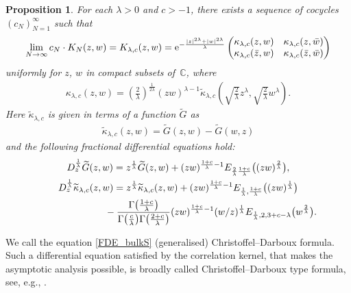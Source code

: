 \documentclass[pdftex]{sigma}
\numberwithin{equation}{section}
\newtheorem{Proposition}[Theorem]{Proposition}
 { \theoremstyle{definition}
\newtheorem{Definition}[Theorem]{Definition}
\newtheorem{Example}[Theorem]{Example}
\newtheorem{Remark}[Theorem]{Remark} }
\newcommand{\C}{{\mathbb C}}
\newcommand{\1}{\chi}
\begin{document}
\begin{Proposition} \label{Thm_bulkS}
	For each $\lambda>0$ and $c>-1$, there exists a sequence of cocycles $(c_N)_{N=1}^\infty$ such that
	\begin{gather*}
			\lim_{N \to \infty} c_N\cdot K_N(z,w)=K_{\lambda,c}(z,w)
			={\rm e}^{ -\frac{ |z|^{2\lambda}+|w|^{2\lambda} }{\lambda} } \begin{pmatrix}
				\kappa_{\lambda,c}(z,w) & \kappa_{\lambda,c}(z,\bar{w}) \\
				\kappa_{\lambda,c}(\bar{z},w) & \kappa_{\lambda,c}(\bar{z},\bar{w})
			\end{pmatrix}
		\end{gather*}
	uniformly for $z$, $w$ in compact subsets of~$\C$, where
	\begin{gather*}
		\kappa_{\lambda,c}(z,w)=\left( \frac{2}{\lambda} \right)^{ \frac{1}{2\lambda} } (zw)^{\lambda-1} \widetilde{\kappa}_{\lambda,c} \left( \sqrt{ \frac{2}{\lambda} } z^\lambda, \sqrt{ \frac{2}{\lambda} } w^\lambda \right).
	\end{gather*}
	Here $\widetilde{\kappa}_{\lambda,c}$ is given in terms of a function $\widetilde{G}$ as
	\begin{gather*}
	\widetilde{\kappa}_{\lambda,c}(z,w)=\widetilde{G}(z,w)-\widetilde{G}(w,z)
	\end{gather*}
 and the following fractional differential equations hold:
	\begin{gather} \label{G zw FDE}
		D_z^{ \frac{1}{\lambda} } \widetilde{G}(z,w)= z^{ \frac{1}{\lambda} } \widetilde{G}(z,w)+(zw)^{\frac{1+c}{\lambda}-1} E_{\frac{2}{\lambda} \frac{1+c}{\lambda} } \big( (zw)^{\frac{2}{\lambda}} \big),
\\
			D_z^{ \frac{1}{\lambda} } \widetilde{\kappa}_{\lambda,c}(z,w)
			= z^{ \frac{1}{\lambda} } \widetilde{\kappa}_{\lambda,c}(z,w)+ (zw)^{ \frac{1+c}{\lambda}-1 } E_{ \frac{1}{\lambda},\frac{1+c}{\lambda} } \big( (zw)^{\frac{1}{\lambda}} \big)
			\nonumber\\
\hphantom{D_z^{ \frac{1}{\lambda} } \widetilde{\kappa}_{\lambda,c}(z,w)=}{}
 -\frac{ \Gamma\big(\frac{1+c}{\lambda}\big) }{\Gamma\big( \frac{c}{\lambda}\big) \Gamma\big( \frac{2+c}{\lambda}\big) } (zw)^{ \frac{1+c}{\lambda}-1 }(w/z)^{\frac{1}{\lambda}} E_{\frac{1}{\lambda},2,3+c-\lambda}\big(w^{\frac{2}{\lambda}}\big) .\label{FDE_bulkS}
		\end{gather}
\end{Proposition}


We call the equation \eqref{FDE_bulkS} (generalised) Christoffel--Darboux formula.
Such a differential equation satisfied by the correlation kernel, that makes the asymptotic analysis possible, is broadly called Christoffel--Darboux type formula, see, e.g., \cite{MR1917675,byun2021lemniscate,MR3450566}.
\end{document}
